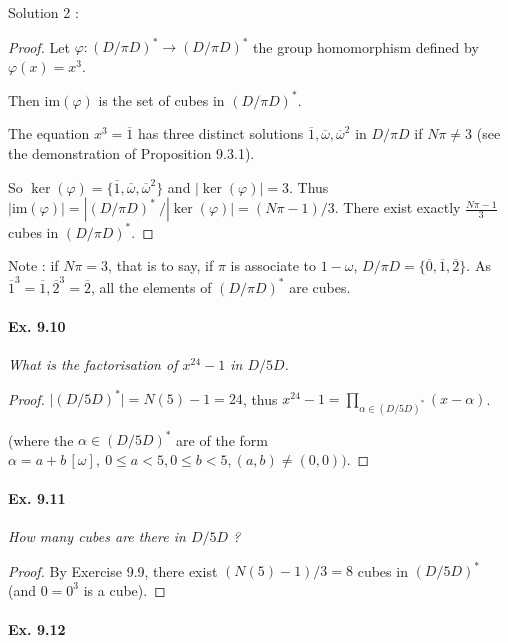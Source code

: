 \documentclass[11pt,a4paper]{article}
\begin{document}
Solution 2 :
\begin{proof}
Let $\varphi : (D/\pi D)^* \to (D/\pi D)^*$ the group homomorphism defined by $\varphi(x) = x^3$.

Then $\mathrm{im}(\varphi)$ is the set of cubes in $(D/\pi D)^*$.

The equation $x^3 = \overline{1}$ has three distinct solutions $\overline{1}, \overline{\omega}, \overline{\omega}^2$  in $D/ \pi D$ if $N\pi \ne 3$ (see the demonstration of Proposition 9.3.1).

So $\ker(\varphi)= \{\overline{1}, \overline{\omega}, \overline{\omega}^2\}$ and $| \ker(\varphi)| = 3$. Thus $| \mathrm{im} (\varphi) | = | (D/\pi D)^* \ / |\ker(\varphi) | = (N\pi - 1)/3$. There exist exactly $\frac{N\pi-1}{3}$ cubes in $(D/\pi D)^*$.
\end{proof}

Note : if $N\pi = 3$, that is to say, if $\pi$ is associate to $1-\omega$, $D/\pi D = \{\overline{0},\overline{1}, \overline{2}\}$. As $\overline{1}^3 = \overline{1}, \overline{2}^3 = \overline{2}$, all the elements of $(D/\pi D)^*$ are cubes.

\paragraph{Ex. 9.10}

{\it What is the factorisation of $x^{24}-1$ in $D/5D$.
}

\begin{proof}
$\vert (D/5D)^*\vert = N(5) - 1 = 24$, thus $x^{24} - 1 = \prod\limits_{\alpha \in (D/ 5 D)^*} (x - \alpha)$.

(where the $\alpha \in (D/ 5 D)^*$ are of the form $\alpha = a + b\, [\omega],\  0 \leq a <5, 0 \leq b <5, (a,b) \ne (0,0))$.
\end{proof}

\paragraph{Ex. 9.11}

{\it How many cubes are there in $D/5D$ ?
}

\begin{proof}
By Exercise 9.9, there exist $(N(5) - 1)/3 = 8$ cubes in $(D/5D)^*$ (and $0 = 0^3$ is a cube).
\end{proof}

\paragraph{Ex. 9.12}
\end{document}

